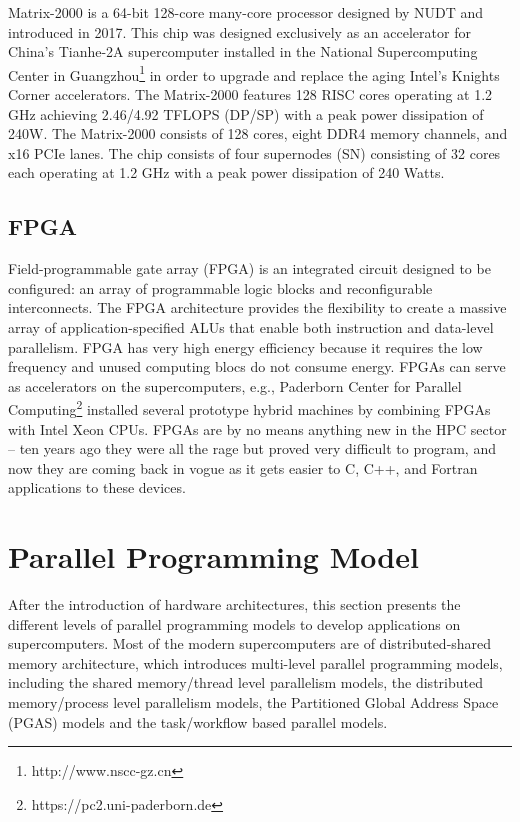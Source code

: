 Matrix-2000 \cite{matrix-2000} is a 64-bit 128-core many-core processor designed by NUDT and introduced in 2017. This chip was designed exclusively as an accelerator for China's Tianhe-2A supercomputer installed in the National Supercomputing Center in Guangzhou\footnote{http://www.nscc-gz.cn} in order to upgrade and replace the aging Intel's Knights Corner accelerators. The Matrix-2000 features 128 RISC cores operating at 1.2 GHz achieving 2.46/4.92 TFLOPS (DP/SP) with a peak power dissipation of 240W. The Matrix-2000 consists of 128 cores, eight DDR4 memory channels, and x16 PCIe lanes. The chip consists of four supernodes (SN) consisting of 32 cores each operating at 1.2 GHz with a peak power dissipation of 240 Watts.

\subsection{FPGA}

Field-programmable gate array (FPGA) is an integrated circuit designed to be configured: an array of programmable logic blocks and reconfigurable interconnects. The FPGA architecture provides the flexibility to create a massive array of application-specified ALUs that enable both instruction and data-level parallelism. FPGA has very high energy efficiency because it requires the low frequency and unused computing blocs do not consume energy. FPGAs can serve as accelerators on the supercomputers, e.g., Paderborn Center for Parallel Computing\footnote{https://pc2.uni-paderborn.de} installed several prototype hybrid machines by combining FPGAs with Intel Xeon CPUs. FPGAs are by no means anything new in the HPC sector – ten years ago they were all the rage but proved very difficult to program, and now they are coming back in vogue as it gets easier to C, C++, and Fortran applications to these devices.


\section{Parallel Programming Model}\label{Parallel Programming Model}

After the introduction of hardware architectures, this section presents the different levels of parallel programming models to develop applications on supercomputers. Most of the modern supercomputers are of distributed-shared memory architecture, which introduces multi-level parallel programming models, including the shared memory/thread level parallelism models, the distributed memory/process level parallelism models, the Partitioned Global Address Space (PGAS) models and the task/workflow based parallel models.

